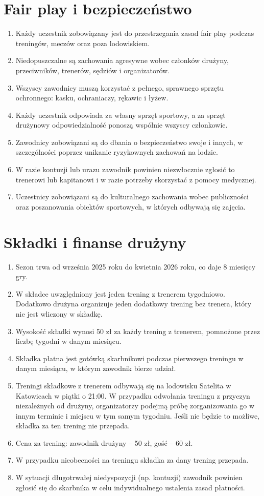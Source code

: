\documentclass[12pt,a4paper]{article}
\let\stdsection\section
\renewcommand\section{\clearpage\stdsection}
\begin{document}
\section{Fair play i bezpieczeństwo}
\begin{enumerate}
  \item Każdy uczestnik zobowiązany jest do przestrzegania zasad fair play podczas treningów, meczów oraz poza lodowiskiem.
  \item Niedopuszczalne są zachowania agresywne wobec członków drużyny, przeciwników, trenerów, sędziów i organizatorów.
  \item Wszyscy zawodnicy muszą korzystać z pełnego, sprawnego sprzętu ochronnego: kasku, ochraniaczy, rękawic i łyżew.
  \item Każdy uczestnik odpowiada za własny sprzęt sportowy, a za sprzęt drużynowy odpowiedzialność ponoszą wspólnie wszyscy członkowie.
  \item Zawodnicy zobowiązani są do dbania o bezpieczeństwo swoje i innych, w szczególności poprzez unikanie ryzykownych zachowań na lodzie.
  \item W razie kontuzji lub urazu zawodnik powinien niezwłocznie zgłosić to trenerowi lub kapitanowi i w razie potrzeby skorzystać z pomocy medycznej.
  \item Uczestnicy zobowiązani są do kulturalnego zachowania wobec publiczności oraz poszanowania obiektów sportowych, w których odbywają się zajęcia.
\end{enumerate}

\section{Składki i finanse drużyny}
\begin{enumerate}
  \item Sezon trwa od września 2025 roku do kwietnia 2026 roku, co daje 8 miesięcy gry.
  \item W składce uwzględniony jest jeden trening z trenerem tygodniowo. Dodatkowo drużyna organizuje jeden dodatkowy trening bez trenera, który nie jest wliczony w składkę.
  \item Wysokość składki wynosi 50 zł za każdy trening z trenerem, pomnożone przez liczbę tygodni w danym miesiącu.
  \item Składka płatna jest gotówką skarbnikowi podczas pierwszego treningu w danym miesiącu, w którym zawodnik bierze udział.
  \item Treningi składkowe z trenerem odbywają się na lodowisku Satelita w Katowicach w piątki o 21:00. W przypadku odwołania treningu z przyczyn niezależnych od drużyny, organizatorzy podejmą próbę zorganizowania go w innym terminie i miejscu w tym samym tygodniu. Jeśli nie będzie to możliwe, składka za ten trening nie przepada.
  \item Cena za trening: zawodnik drużyny -- 50 zł, gość -- 60 zł.
  \item W przypadku nieobecności na treningu składka za dany trening przepada.
  \item W sytuacji długotrwałej niedyspozycji (np. kontuzji) zawodnik powinien zgłosić się do skarbnika w celu indywidualnego ustalenia zasad płatności.
\end{enumerate}
\end{document}
